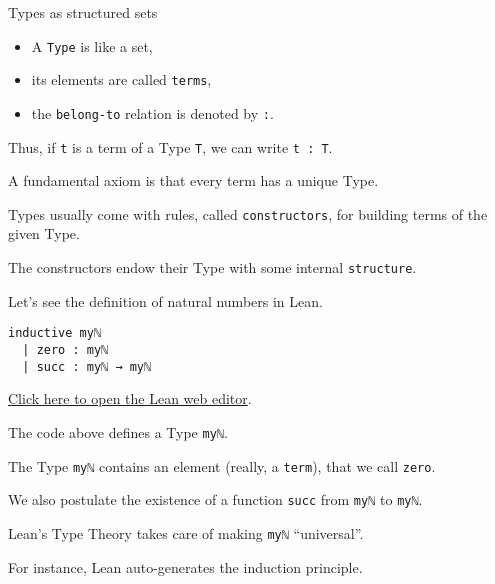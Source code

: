 \documentclass{beamer}
\begin{document}
\begin{frame}[fragile]{Types as structured sets}

\vspace{-18pt}
\begin{itemize}
\setlength\itemsep{-18pt}
\item
  A {\color{violet}\verb`Type`} is like a set,
\item
  its elements are called {\color{violet}\verb`terms`},
\item
  the {\color{violet}\verb`belong-to`} relation is denoted by {\color{violet}\verb`:`}.
\end{itemize}

Thus, if {\color{violet}\verb`t`} is a term of a Type {\color{violet}\verb`T`}, we can write {\color{violet}\verb`t : T`}.
\vspace{-10pt}

A fundamental axiom is that every term has a unique Type.
\vspace{-10pt}

Types usually come with rules, called {\color{violet}\verb`constructors`}, for building terms of the given Type.
\vspace{-10pt}

The constructors endow their Type with some internal {\color{violet}\verb`structure`}.

Let's see the definition of natural numbers in Lean.
\end{frame}

\begin{frame}[fragile]

\begin{verbatim}
inductive myℕ
  | zero : myℕ
  | succ : myℕ → myℕ
\end{verbatim}
{\small{\href{https://leanprover-community.github.io/lean-web-editor/#code=inductive%20my%E2%84%95%0A%20%20%7C%20zero%20%3A%20my%E2%84%95%0A%20%20%7C%20succ%20%3A%20my%E2%84%95%20%E2%86%92%20my%E2%84%95%0A%0A%23print%20prefix%20my%E2%84%95%0A}{Click here to open the Lean web editor}.}}
\bigskip

The code above defines a Type {\color{violet}\verb`myℕ`}.
\bigskip

The Type {\color{violet}\verb`myℕ`} contains an element (really, a {\color{violet}\verb`term`}), that we call {\color{violet}\verb`zero`}.
\bigskip

We also postulate the existence of a function {\color{violet}\verb`succ`} from {\color{violet}\verb`myℕ`} to {\color{violet}\verb`myℕ`}.
\bigskip

Lean's Type Theory takes care of making {\color{violet}\verb`myℕ`} ``universal''.
\bigskip

For instance, Lean auto-generates the induction principle.
\end{frame}
\end{document}
